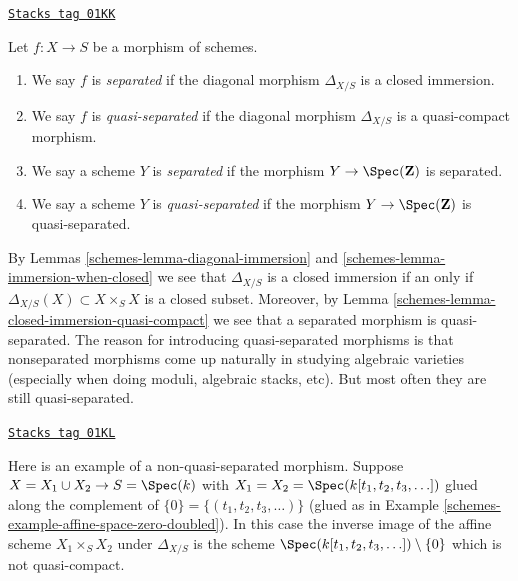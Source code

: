 \begin{definition}[Separated]
\label{schemes-definition-separated}
\href{https://stacks.math.columbia.edu/tag/01KK}{\texttt{Stacks tag 01KK}}

Let $f : X \to S$ be a morphism of schemes.
\begin{enumerate}
\item We say $f$ is {\it separated} if the diagonal morphism $\Delta_{X/S}$
is a closed immersion.
\item We say $f$ is {\it quasi-separated} if the diagonal morphism
$\Delta_{X/S}$ is a quasi-compact morphism.
\item We say a scheme $Y$ is {\it separated} if the morphism
$Y \to \Spec(\mathbf{Z})$ is separated.
\item We say a scheme $Y$ is {\it quasi-separated} if the morphism
$Y \to \Spec(\mathbf{Z})$ is quasi-separated.
\end{enumerate}
\end{definition}

By Lemmas \ref{schemes-lemma-diagonal-immersion} and \ref{schemes-lemma-immersion-when-closed}
we see that $\Delta_{X/S}$ is a closed immersion if an only if
$\Delta_{X/S}(X) \subset X \times_S X$ is a closed subset. Moreover,
by Lemma \ref{schemes-lemma-closed-immersion-quasi-compact} we see that a
separated morphism is quasi-separated. The reason for introducing
quasi-separated morphisms is that nonseparated morphisms come up naturally
in studying algebraic varieties (especially when doing moduli,
algebraic stacks, etc). But most often they are still quasi-separated.

\begin{example}
\label{schemes-example-not-quasi-separated}
\href{https://stacks.math.columbia.edu/tag/01KL}{\texttt{Stacks tag 01KL}}

Here is an example of a non-quasi-separated morphism.
Suppose $X = X_1 \cup X_2 \to S = \Spec(k)$ with
$X_1 = X_2 = \Spec(k[t_1, t_2, t_3, \ldots])$
glued along the complement of $\{0\} = \{(t_1, t_2, t_3, \ldots)\}$
(glued as in Example \ref{schemes-example-affine-space-zero-doubled}).
In this case the inverse image of the affine scheme
$X_1 \times_S X_2$ under $\Delta_{X/S}$ is the scheme
$\Spec(k[t_1, t_2, t_3, \ldots]) \setminus \{0\}$
which is not quasi-compact.
\end{example}

